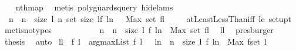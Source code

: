 \begin{isabellebody}
\ \ \isamarkupfalse%
\ nth{\isacharunderscore}map\ \isamarkupfalse%
\ {\isacharparenleft}metis\ {\isacharparenleft}poly{\isacharunderscore}guards{\isacharunderscore}query{\isacharcomma}\ hide{\isacharunderscore}lams{\isacharparenright}{\isacharparenright}\ \isamarkupfalse%
\ \isamarkupfalse%
\ {\isachardoublequoteopen}{\isachardot}{\isachardot}{\isachardot}\ {\isacharequal}\ \isanewline
\ \ {\isacharbrackleft}n\ {\isachardot}\ n\ {\isacharless}{\isacharminus}\ {\isacharbrackleft}{}{\isachardot}{\isachardot}{\isacharless}size\ l{\isacharbrackright}{\isacharcomma}\ {\isacharparenleft}n{\isasymin}\ set\ {\isacharbrackleft}{}{\isachardot}{\isachardot}{\isacharless}size\ l{\isacharbrackright}{\isacharparenright}{\isacharcomma}{\isacharparenleft}f\ {\isacharparenleft}l{\isacharbang}n{\isacharparenright}\ \ {\isasymge}\ Max\ {\isacharparenleft}set\ {\isacharquery}fl{\isacharparenright}{\isacharparenright}{\isacharbrackright}{\isachardoublequoteclose}\ \isanewline
\ \ \isamarkupfalse%
\ atLeastLessThan{\isacharunderscore}iff\ le{}\ set{\isacharunderscore}upt\ \isamarkupfalse%
\ {\isacharparenleft}metis{\isacharparenleft}no{\isacharunderscore}types{\isacharparenright}{\isacharparenright}\isanewline
\ \ \isamarkupfalse%
\ \isamarkupfalse%
\ {\isachardoublequoteopen}{\isachardot}{\isachardot}{\isachardot}\ {\isacharequal}\ \ \isanewline
\ \ {\isacharbrackleft}n\ {\isachardot}\ n\ {\isacharless}{\isacharminus}\ {\isacharbrackleft}{}{\isachardot}{\isachardot}{\isacharless}size\ l{\isacharbrackright}{\isacharcomma}\ f\ {\isacharparenleft}l{\isacharbang}n{\isacharparenright}\ {\isasymge}\ Max\ {\isacharparenleft}set\ {\isacharquery}fl{\isacharparenright}{\isacharbrackright}{\isachardoublequoteclose}\ \isamarkupfalse%
\ ll{}\ \isamarkupfalse%
\ presburger\ \isanewline
\ \ \isamarkupfalse%
\ \isamarkupfalse%
\ {\isacharquery}thesis\ \isamarkupfalse%
\ auto\isanewline
{}\isamarkupfalse%
%
\endisatagproof
{\isafoldproof}%
%
\isadelimproof
\isanewline
%
\endisadelimproof
\isanewline
{}\isamarkupfalse%
\ ll{}{}{\isacharcolon}\ \ f\ l\ \ {\isachardoublequoteopen}argmaxList\ f\ l\ {\isacharequal}\ {\isacharbrackleft}\ l{\isacharbang}n\ {\isachardot}\ n\ {\isacharless}{\isacharminus}\ {\isacharbrackleft}{}{\isachardot}{\isachardot}{\isacharless}size\ l{\isacharbrackright}{\isacharcomma}\ f\ {\isacharparenleft}l{\isacharbang}n{\isacharparenright}\ {\isasymge}\ Max\ {\isacharparenleft}f{\isacharbackquote}{\isacharparenleft}set\ l{\isacharparenright}{\isacharparenright}{\isacharbrackright}{\isachardoublequoteclose}\isanewline

\end{isabellebody}
